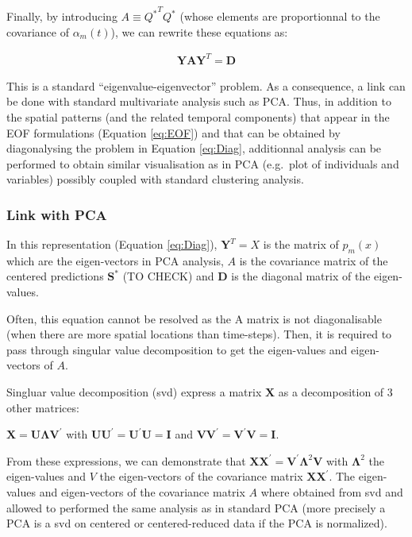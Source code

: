 \documentclass[
  english,
  man]{apa6}
\begin{document}
Finally, by introducing \(A \equiv {Q^*}^T Q^*\) (whose elements are proportionnal to the covariance of \(\alpha_m(t)\)), we can rewrite these equations as:

\begin{align}
\label{eq:Diag}
\mathbf{YAY}^T=\mathbf{D}
\end{align}

This is a standard \enquote{eigenvalue-eigenvector} problem. As a consequence, a link can be done with standard multivariate analysis such as PCA. Thus, in addition to the spatial patterns (and the related temporal components) that appear in the EOF formulations (Equation \ref{eq:EOF}) and that can be obtained by diagonalysing the problem in Equation \ref{eq:Diag}, additionnal analysis can be performed to obtain similar visualisation as in PCA (e.g.~plot of individuals and variables) possibly coupled with standard clustering analysis.

\hypertarget{link-with-pca}{%
\subsubsection{Link with PCA}\label{link-with-pca}}

In this representation (Equation \ref{eq:Diag}), \(\mathbf{Y}^T=X\) is the matrix of \(p_{m}(x)\) which are the eigen-vectors in PCA analysis, \(A\) is the covariance matrix of the centered predictions \(\mathbf{S}^*\) (TO CHECK) and \(\mathbf{D}\) is the diagonal matrix of the eigen-values.

Often, this equation cannot be resolved as the A matrix is not diagonalisable (when there are more spatial locations than time-steps). Then, it is required to pass through singular value decomposition to get the eigen-values and eigen-vectors of \(A\).

Singluar value decomposition (svd) express a matrix \(\mathbf{X}\) as a decomposition of 3 other matrices:

\(\mathbf{X}=\mathbf{U} \mathbf{\Lambda} \mathbf{V}^{\prime}\) with \(\mathbf{U U}^{\prime}=\mathbf{U}^{\prime} \mathbf{U}=\mathbf{I}\) and \(\mathbf{V V}^{\prime}=\mathbf{V}^{\prime} \mathbf{V}=\mathbf{I}\).

From these expressions, we can demonstrate that \(\mathbf{XX}^{\prime} = \mathbf{V}^{\prime} \mathbf{\Lambda}^2 \mathbf{V}\) with \(\mathbf{\Lambda}^2\) the eigen-values and \(V\) the eigen-vectors of the covariance matrix \(\mathbf{XX}^{\prime}\). The eigen-values and eigen-vectors of the covariance matrix \(A\) where obtained from svd and allowed to performed the same analysis as in standard PCA (more precisely a PCA is a svd on centered or centered-reduced data if the PCA is normalized).
\end{document}
